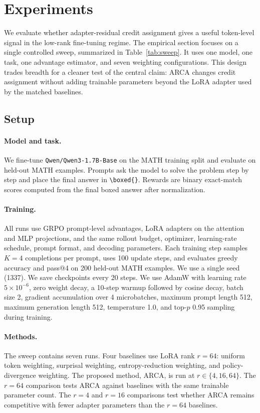 \section{Experiments}\label{sec:experiments}

We evaluate whether adapter-residual credit assignment gives a useful
token-level signal in the low-rank fine-tuning regime. The empirical section
focuses on a single controlled sweep, summarized in
Table~\ref{tab:sweep}. It uses one model, one task, one advantage estimator,
and seven weighting configurations. This design trades breadth for a cleaner
test of the central claim: ARCA changes credit assignment without adding
trainable parameters beyond the LoRA adapter used by the matched baselines.

\subsection{Setup}

\paragraph{Model and task.} We fine-tune \texttt{Qwen/Qwen3-1.7B-Base} on
the MATH training split and evaluate on held-out MATH examples. Prompts ask
the model to solve the problem step by step and place the final answer in
\texttt{\textbackslash boxed\{\}}. Rewards are binary exact-match scores
computed from the final boxed answer after normalization.

\paragraph{Training.} All runs use GRPO prompt-level advantages, LoRA
adapters on the attention and MLP projections, and the same rollout budget,
optimizer, learning-rate schedule, prompt format, and decoding parameters.
Each training step samples $K=4$ completions per prompt, uses 100 update
steps, and evaluates greedy accuracy and pass@4 on 200 held-out MATH
examples. We use a single seed (1337). We save checkpoints every 20 steps.
We use AdamW with learning rate $5\times10^{-6}$, zero weight decay, a
10-step warmup followed by cosine decay, batch size 2, gradient accumulation
over 4 microbatches, maximum prompt length 512, maximum generation length
512, temperature 1.0, and top-$p$ 0.95 sampling during training.

\paragraph{Methods.} The sweep contains seven runs. Four baselines use LoRA
rank $r=64$: uniform token weighting, surprisal weighting,
entropy-reduction weighting, and policy-divergence weighting. The proposed
method, ARCA, is run at $r \in \{4,16,64\}$. The $r=64$ comparison tests
ARCA against baselines with the same trainable parameter count. The $r=4$
and $r=16$ comparisons test whether ARCA remains competitive with fewer
adapter parameters than the $r=64$ baselines.

